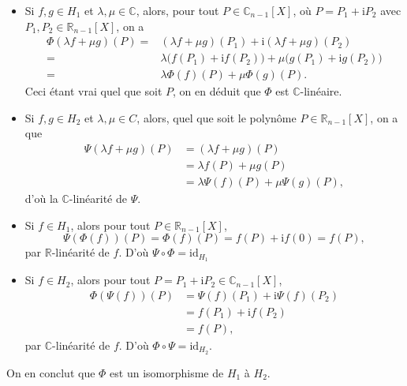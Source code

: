 \documentclass{../../td}
\begin{document}
\begin{enumerate}
\begin{enumerate}
          \begin{itemize}
            \item Si $f, g \in H_1$ et $\lambda, \mu \in \mathds{C}$, alors, pour tout $P \in \mathds{C}_{n-1}[X]$, où $P = P_1 + \mathrm{i} P_2$ avec $P_1, P_2 \in \mathds{R}_{n-1}[X]$, on a 
              \begin{align*}
                \Phi(\lambda f + \mu g)(P) =& (\lambda f + \mu g)(P_1) + \mathrm{i} (\lambda f + \mu g)(P_2)\\
                =& \lambda \big(f(P_1) + \mathrm{i} f(P_2)\big) + \mu \big(g(P_1) + \mathrm{i} g(P_2)\big)\\
                =& \lambda \Phi(f)(P) + \mu \Phi(g)(P)
              .\end{align*}
              Ceci étant vrai quel que soit $P$, on en déduit que  $\Phi$ est  $\mathds{C}$-linéaire.
            \item Si $f, g \in H_2$ et $\lambda, \mu \in C$, alors, quel que soit le polynôme $P \in \mathds{R}_{n-1}[X]$, on a que 
              \begin{align*}
                \Psi(\lambda f + \mu g)(P) &= (\lambda f + \mu g)(P) \\
                &= \lambda f(P) + \mu g(P) \\
                &= \lambda \Psi(f)(P) + \mu \Psi(g)(P)
              ,\end{align*}
              d'où la $\mathds{C}$-linéarité de $\Psi$.
            \item Si $f \in H_1$, alors pour tout $P \in \mathds{R}_{n-1}[X]$, \[
              \Psi(\Phi(f))(P) = \Phi(f)(P) = f(P) + \mathrm{i} f(0) = f(P)
              ,\] par $\mathds{R}$-linéarité de $f$.
              D'où $\Psi \circ \Phi = \mathrm{id}_{H_1}$
            \item Si $f \in H_2$, alors pour tout $P = P_1 + \mathrm{i} P_2 \in \mathds{C}_{n-1}[X]$,
              \begin{align*}
                \Phi(\Psi(f))(P) &= \Psi(f)(P_1) + \mathrm{i}\Psi(f)(P_2)\\
                &= f(P_1) + \mathrm{i} f(P_2) \\
                &= f(P)
              ,\end{align*}
              par $\mathds{C}$-linéarité de $f$.
              D'où $\Phi \circ \Psi = \mathrm{id}_{H_2}$.
          \end{itemize}
          On en conclut que $\Phi$ est un isomorphisme de $H_1$ à $H_2$.


\end{enumerate}
\end{enumerate}
\end{document}
